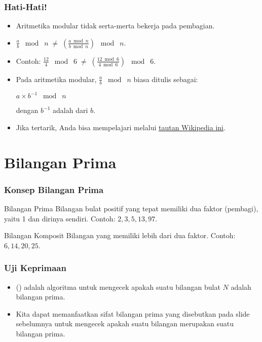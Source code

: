 \begin{frame}
\frametitle{Hati-Hati!}
\begin{itemize}
  \item Aritmetika modular tidak serta-merta bekerja pada pembagian.
  \item $\frac{a}{b} \; \bmod\; n \; \neq \; \left( \frac{a \bmod n}{b \bmod n} \right) \; \bmod\; n$.
  \item Contoh: $\frac{12}{4} \; \bmod\; 6 \; \neq \; \left( \frac{12 \bmod 6}{4 \bmod 6} \right) \; \bmod\; 6$.
  \newline
  \item Pada aritmetika modular, $\frac{a}{b} \; \bmod\; n$ biasa ditulis sebagai:
  \newline
  \begin{center}
    $a \times b^{-1}\; \bmod\; n$
    \newline
  \end{center}
  dengan $b^{-1}$ adalah  dari $b$.
  \item Jika tertarik, Anda bisa mempelajari  melalui \textcolor{blue}{\href{https://en.wikipedia.org/wiki/  Modular_multiplicative_inverse}{tautan Wikipedia ini}.} 
\end{itemize}
\end{frame}

\section{Bilangan Prima}
\frame{\sectionpage}

\begin{frame}
\frametitle{Konsep Bilangan Prima}
\begin{block}{Bilangan Prima}
Bilangan bulat positif yang tepat memiliki dua faktor (pembagi), yaitu 1 dan dirinya sendiri.
\newline
Contoh: $2, 3, 5, 13, 97$.
\end{block}

\begin{block}{Bilangan Komposit}
Bilangan yang memiliki lebih dari dua faktor.
\newline
Contoh: $6, 14, 20, 25$.
\end{block}
\end{frame}

\begin{frame}
\frametitle{Uji Keprimaan}
\begin{itemize}
  \item {} () adalah algoritma untuk mengecek apakah suatu bilangan bulat $N$ adalah bilangan prima.
  \item Kita dapat memanfaatkan sifat bilangan prima yang disebutkan pada slide sebelumnya untuk mengecek apakah suatu bilangan merupakan suatu bilangan prima. 
\end{itemize}
\end{frame}


